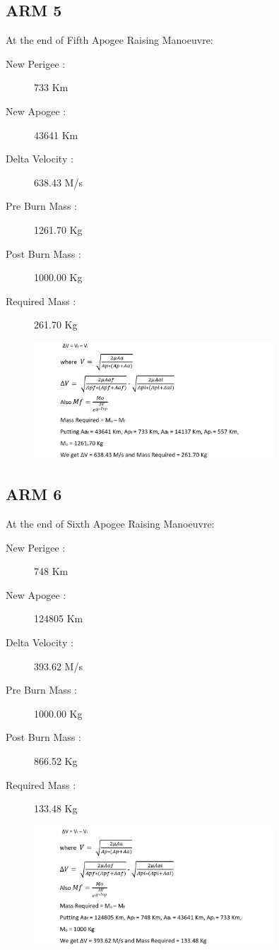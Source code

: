 \documentclass[11pt,fleqn]{book} %
\begin{document}
\subsection{ARM 5}

At the end of Fifth Apogee Raising Manoeuvre:
\begin{description}
\item[New Perigee :] 733 Km
\item[New Apogee :] 43641 Km
\item[Delta Velocity :] 638.43 M/s
\item[Pre Burn Mass :] 1261.70 Kg
\item[Post Burn Mass :] 1000.00 Kg
\item[Required Mass :] 261.70 Kg
\end{description}

\begin{figure}[h]
    \includegraphics[width=0.8\textwidth]{ARM5.png}
\end{figure}

\subsection{ARM 6}

At the end of Sixth Apogee Raising Manoeuvre:
\begin{description}
\item[New Perigee :] 748 Km
\item[New Apogee :] 124805 Km
\item[Delta Velocity :] 393.62 M/s
\item[Pre Burn Mass :] 1000.00 Kg
\item[Post Burn Mass :] 866.52 Kg
\item[Required Mass :] 133.48 Kg
\end{description}

\begin{figure}[h]
    \includegraphics[width=0.8\textwidth]{ARM6.png}
\end{figure}
\clearpage
{}
\end{document}
